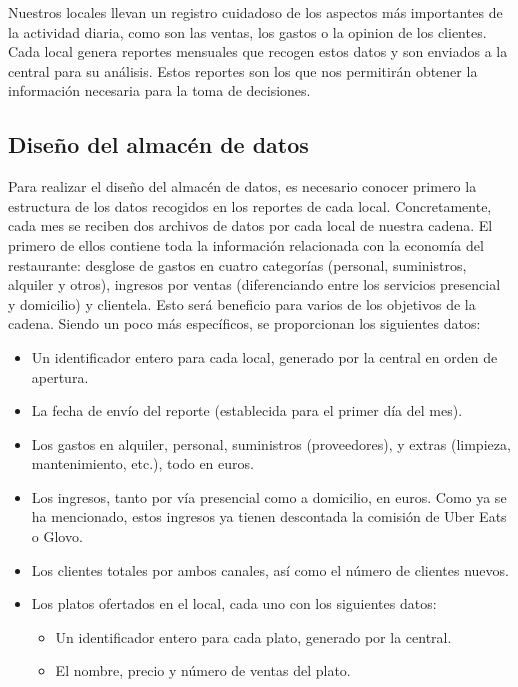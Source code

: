 \documentclass[11pt]{opticajnl}
\begin{document}
Nuestros locales llevan un registro cuidadoso de los aspectos más importantes de la actividad diaria, como son las ventas, los gastos o la opinion de los clientes. Cada local genera reportes mensuales que recogen estos datos y son enviados a la central para su análisis. Estos reportes son los que nos permitirán obtener la información necesaria para la toma de decisiones. 

\subsection{Diseño del almacén de datos}

Para realizar el diseño del almacén de datos, es necesario conocer primero la estructura de los datos recogidos en los reportes de cada local. Concretamente, cada mes se reciben dos archivos de datos por cada local de nuestra cadena. El primero de ellos contiene toda la información relacionada con la economía del restaurante: desglose de gastos en cuatro categorías (personal, suministros, alquiler y otros), ingresos por ventas (diferenciando entre los servicios presencial y domicilio) y clientela. Esto será beneficio para varios de los objetivos de la cadena. Siendo un poco más específicos, se proporcionan los siguientes datos:
\begin{itemize}
\item Un identificador entero para cada local, generado por la central en orden de apertura.
\item La fecha de envío del reporte (establecida para el primer día del mes). 
\item Los gastos en alquiler, personal, suministros (proveedores), y extras (limpieza, mantenimiento, etc.), todo en euros.
\item Los ingresos, tanto por vía presencial como a domicilio, en euros. Como ya se ha mencionado, estos ingresos ya tienen descontada la comisión de Uber Eats o Glovo.
\item Los clientes totales por ambos canales, así como el número de clientes nuevos.
\item Los platos ofertados en el local, cada uno con los siguientes datos:
\begin{itemize}
\item Un identificador entero para cada plato, generado por la central.
\item El nombre, precio y número de ventas del plato. 
\end{itemize}
\end{itemize}
\end{document}
